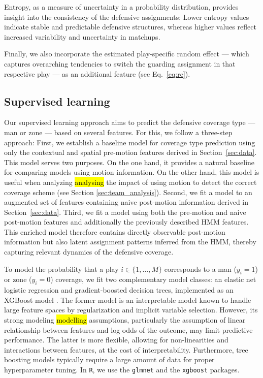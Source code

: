 \documentclass[namedate,webpdf,modern,medium]{oup-authoring-template}
\providecommand{\DIFadd}[1]{\ifmmode{#1}\else\hl{#1}\fi} %
\providecommand{\DIFdel}[1]{{\protect\color{red}#1}} %
\providecommand{\DIFaddbegin}{} %
\providecommand{\DIFaddend}{} %
\providecommand{\DIFdelbegin}{} %
\providecommand{\DIFdelend}{} %
\begin{document}
Entropy, as a measure of uncertainty in a probability distribution, provides insight into the consistency of the defensive assignments: Lower entropy values indicate stable and predictable defensive structures, whereas higher values reflect increased variability and uncertainty in matchups. 

Finally, we also incorporate the estimated play-specific random effect --- which captures overarching tendencies to switch the guarding assignment in that respective play --- as an additional feature (see Eq.~\ref{eq:re}).

\subsection{Supervised learning}
Our supervised learning approach aims to predict the defensive coverage type --- man or zone --- based on several features. %
For this, we follow a three-step approach: First, we establish a baseline model for coverage type prediction using only the contextual and spatial pre-motion features derived in Section~\ref{sec:data}. This model serves two purposes. On the one hand, it provides a natural baseline for comparing models using motion information. On the other hand, this model is useful when \DIFdelbegin \DIFdel{analyzing }\DIFdelend \DIFaddbegin \DIFadd{analysing }\DIFaddend the impact of using motion to detect the correct coverage scheme (see Section \ref{sec:team_analysis}). Second, we fit a model to an augmented set of features containing naive post-motion information derived in Section~\ref{sec:data}. Third, we fit a model using both the pre-motion and naive post-motion features and additionally the previously described HMM features. This enriched model therefore contains directly observable post-motion information but also latent assignment patterns inferred from the HMM, thereby capturing relevant dynamics of the defensive coverage.

To model the probability that a play \( i \in \{1, \dots, M\} \) corresponds to a man (\( y_i = 1 \)) or zone (\( y_i = 0 \)) coverage, we fit two complementary model classes: an elastic net logistic regression \citep{Zou05elastic} and gradient-boosted decision trees, implemented as an XGBoost model \citep{chen2016xgboost}. The former model is an interpretable model known to handle large feature spaces by regularization and implicit variable selection. However, its strong \DIFdelbegin \DIFdel{modeling }\DIFdelend \DIFaddbegin \DIFadd{modelling }\DIFaddend assumptions, particularly the assumption of linear relationship between features and log odds of the outcome, may limit predictive performance. The latter is more flexible, allowing for non-linearities and interactions between features, at the cost of interpretability. Furthermore, tree boosting models typically require a large amount of data for proper hyperparameter tuning. In \texttt{R}, we use the \texttt{glmnet} \citep{friedman2021package} and the \texttt{xgboost} \citep{chen2019package} packages.
\end{document}
